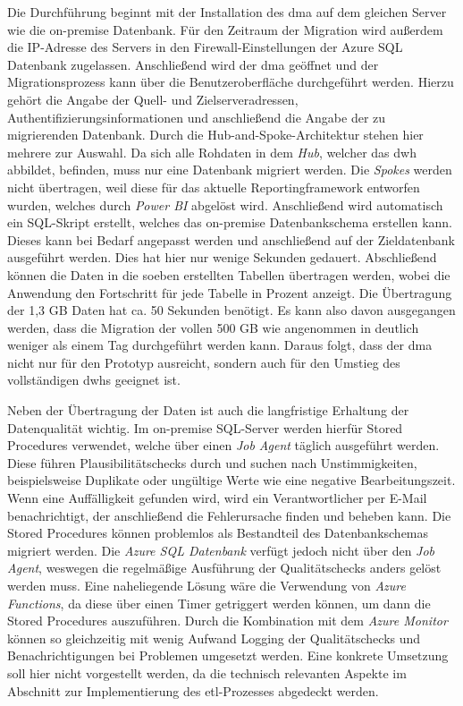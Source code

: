 Die Durchführung beginnt mit der Installation des \ac{dma} auf dem gleichen Server wie die on-premise Datenbank. Für den Zeitraum der Migration wird außerdem die IP-Adresse des Servers in den Firewall-Einstellungen der Azure SQL Datenbank zugelassen. Anschließend wird der \ac{dma} geöffnet und der Migrationsprozess kann über die Benutzeroberfläche durchgeführt werden. Hierzu gehört die Angabe der Quell- und Zielserveradressen, Authentifizierungsinformationen und anschließend die Angabe der zu migrierenden Datenbank. Durch die Hub-and-Spoke-Architektur stehen hier mehrere zur Auswahl. Da sich alle Rohdaten in dem \textit{Hub}, welcher das \ac{dwh} abbildet, befinden, muss nur eine Datenbank migriert werden. Die \textit{Spokes} werden nicht übertragen, weil diese für das aktuelle Reportingframework entworfen wurden, welches durch \textit{Power BI} abgelöst wird. Anschließend wird automatisch ein SQL-Skript erstellt, welches das on-premise Datenbankschema erstellen kann. Dieses kann bei Bedarf angepasst werden und anschließend auf der Zieldatenbank ausgeführt werden. Dies hat hier nur wenige Sekunden gedauert. Abschließend können die Daten in die soeben erstellten Tabellen übertragen werden, wobei die Anwendung den Fortschritt für jede Tabelle in Prozent anzeigt. Die Übertragung der 1,3 GB Daten hat ca. 50 Sekunden benötigt. Es kann also davon ausgegangen werden, dass die Migration der vollen 500 GB wie angenommen in deutlich weniger als einem Tag durchgeführt werden kann. Daraus folgt, dass der \ac{dma} nicht nur für den Prototyp ausreicht, sondern auch für den Umstieg des vollständigen \acp{dwh} geeignet ist.

Neben der Übertragung der Daten ist auch die langfristige Erhaltung der Datenqualität wichtig. Im on-premise SQL-Server werden hierfür Stored Procedures verwendet, welche über einen \textit{Job Agent} täglich ausgeführt werden. Diese führen Plausibilitätschecks durch und suchen nach Unstimmigkeiten, beispielsweise Duplikate oder ungültige Werte wie eine negative Bearbeitungszeit. Wenn eine Auffälligkeit gefunden wird, wird ein Verantwortlicher per E-Mail benachrichtigt, der anschließend die Fehlerursache finden und beheben kann. Die Stored Procedures können problemlos als Bestandteil des Datenbankschemas migriert werden. Die \textit{Azure SQL Datenbank} verfügt jedoch nicht über den \textit{Job Agent}, weswegen die regelmäßige Ausführung der Qualitätschecks anders gelöst werden muss. Eine naheliegende Lösung wäre die Verwendung von \textit{Azure Functions}, da diese über einen Timer getriggert werden können, um dann die Stored Procedures auszuführen. Durch die Kombination mit dem \textit{Azure Monitor} können so gleichzeitig mit wenig Aufwand Logging der Qualitätschecks und Benachrichtigungen bei Problemen umgesetzt werden. Eine konkrete Umsetzung soll hier nicht vorgestellt werden, da die technisch relevanten Aspekte im Abschnitt zur Implementierung des \ac{etl}-Prozesses abgedeckt werden.


